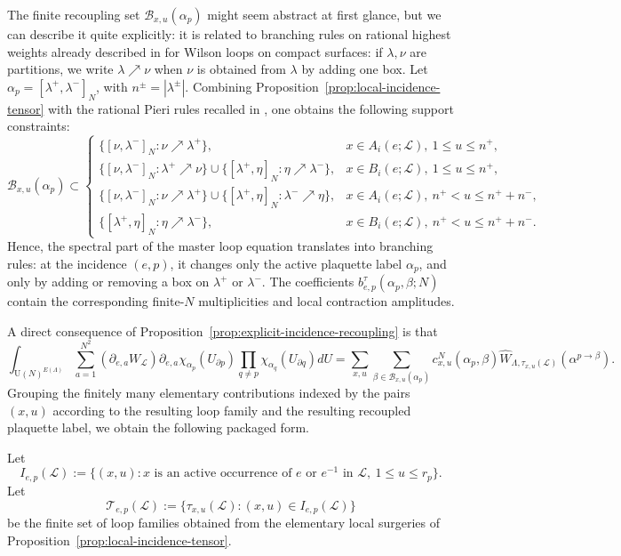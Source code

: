 \documentclass[11pt,a4paper,reqno]{article}
\theoremstyle{definition}
\theoremstyle{remark}
\newcommand\U{{\mathrm U}}
\newcommand\Lc{{\mathcal{L}}}
\newcommand\B{{\mathcal{B}}}
\begin{document}
The finite recoupling set \(\B_{x,u}(\alpha_p)\) might seem abstract at first glance, but we can describe it quite explicitly: it is related to branching rules on rational highest weights already described in \cite[\S 2.2]{Lem25} for Wilson loops on compact surfaces: if \(\lambda,\nu\) are partitions, we write \(\lambda\nearrow\nu\) when \(\nu\) is obtained from \(\lambda\) by adding one
box. Let \(\alpha_p=[\lambda^+,\lambda^-]_N\), with
\(n^\pm=|\lambda^\pm|\). Combining Proposition~\ref{prop:local-incidence-tensor} with
the rational Pieri rules recalled in \cite{Lem25}, one obtains the following
support constraints:
\[
\B_{x,u}(\alpha_p)\subset
\begin{cases}
\bigl\{[\nu,\lambda^-]_N:\nu\nearrow\lambda^+\bigr\},
&
x\in A_i(e;\Lc),\ 1\leq u\leq n^+,
\\[0.5em]
\bigl\{[\nu,\lambda^-]_N:\lambda^+\nearrow\nu\bigr\}
\cup
\bigl\{[\lambda^+,\eta]_N:\eta\nearrow\lambda^-\bigr\},
&
x\in B_i(e;\Lc),\ 1\leq u\leq n^+,
\\[0.5em]
\bigl\{[\nu,\lambda^-]_N:\nu\nearrow\lambda^+\bigr\}
\cup
\bigl\{[\lambda^+,\eta]_N:\lambda^-\nearrow\eta\bigr\},
&
x\in A_i(e;\Lc),\ n^+<u\leq n^++n^-,
\\[0.5em]
\bigl\{[\lambda^+,\eta]_N:\eta\nearrow\lambda^-\bigr\},
&
x\in B_i(e;\Lc),\ n^+<u\leq n^++n^- .
\end{cases}
\]
Hence, the spectral part of the master loop equation translates into branching rules: at the incidence \((e,p)\), it changes only the active plaquette label \(\alpha_p\), and only by adding or removing a box on \(\lambda^+\) or \(\lambda^-\). The coefficients \(b^\tau_{e,p}(\alpha_p,\beta;N)\) contain the corresponding finite-\(N\) multiplicities and local contraction amplitudes.

A direct consequence of Proposition~\ref{prop:explicit-incidence-recoupling} is that
\[
\int_{\U(N)^{E(\Lambda)}} \sum_{a=1}^{N^2}(\partial_{e,a}W_{\Lc})\partial_{e,a}\chi_{\alpha_p}(U_{\partial p})\prod_{q\neq p}\chi_{\alpha_q}(U_{\partial q})dU=\sum_{x,u}\sum_{\beta\in \B_{x,u}(\alpha_p)}c^N_{x,u}(\alpha_p,\beta)\widehat W_{\Lambda,\tau_{x,u}(\Lc)}(\alpha^{p\to \beta}).
\]
Grouping the finitely many elementary contributions indexed by the pairs $(x,u)$ according to the resulting loop family and the resulting recoupled plaquette label, we obtain the following packaged form.

Let
\[
I_{e,p}(\Lc):=\{(x,u): x \text{ is an active occurrence of } e \text{ or } e^{-1}\text{ in }\Lc,\ 1\le u\le r_p\}.
\]
Let
\[
\mathcal T_{e,p}(\Lc):=\{\tau_{x,u}(\Lc):(x,u)\in I_{e,p}(\Lc)\}
\]
be the finite set of loop families obtained from the elementary local surgeries of Proposition~\ref{prop:local-incidence-tensor}.
\end{document}
